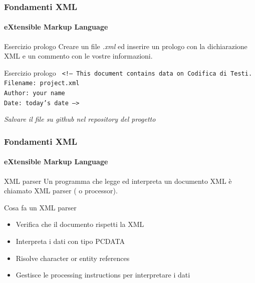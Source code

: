 \begin{frame}
	\frametitle{Fondamenti XML}
	\framesubtitle{eXtensible Markup Language}
	\addtocounter{nframe}{1}

	\begin{block}{Esercizio prologo}
		Creare un file \textit{.xml} ed inserire un prologo con la dichiarazione XML e un commento con le vostre informazioni.
	\end{block}

	\begin{block}{Esercizio prologo}
		\texttt{
		 <!--
		 	This document contains data on Codifica di Testi.
		 	\\Filename: project.xml
		 	\\Author: your name
		 	\\Date: today's date
		-->
		}
	\end{block}

	\begin{tiny}
		\textit{Salvare il file su github nel repository del progetto}
	\end{tiny}

\end{frame}

\begin{frame}
	\frametitle{Fondamenti XML}
	\framesubtitle{eXtensible Markup Language}
	\addtocounter{nframe}{1}

	\begin{block}{XML parser}
		Un programma che legge ed interpreta un documento XML è chiamato XML parser ( o processor).
	\end{block}
	\begin{block}{Cosa fa un XML parser}
		\begin{itemize}
			\item Verifica che il documento rispetti la  XML
			\item Interpreta i dati con tipo PCDATA 
			\item Risolve character or entity references
			\item Gestisce le processing instructions per interpretare i dati
		\end{itemize}
	\end{block}

\end{frame}

